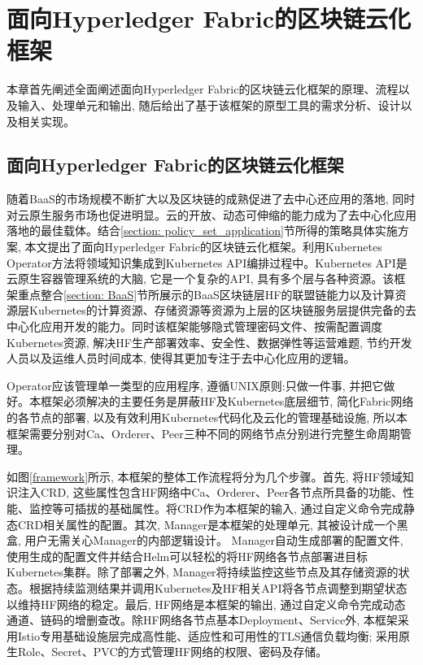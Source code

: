 \chapter{面向Hyperledger Fabric的区块链云化框架}

本章首先阐述全面阐述面向Hyperledger Fabric的区块链云化框架的原理、流程以及输入、处理单元和输出, 随后给出了基于该框架的原型工具的需求分析、设计以及相关实现。

\section{面向Hyperledger Fabric的区块链云化框架}\label{section: framework}

随着BaaS的市场规模不断扩大以及区块链的成熟促进了去中心还应用的落地, 同时对云原生服务市场也促进明显。云的开放、动态可伸缩的能力成为了去中心化应用落地的最佳载体。结合\ref{section: policy_set_application}节所得的策略具体实施方案, 本文提出了面向Hyperledger Fabric的区块链云化框架。利用Kubernetes Operator方法将领域知识集成到Kubernetes API编排过程中\cite{henning2021reproducible}。Kubernetes API是云原生容器管理系统的大脑, 它是一个复杂的API, 具有多个层与各种资源\cite{Yilmaz2021}。该框架重点整合\ref{section: BaaS}节所展示的BaaS区块链层HF的联盟链能力以及计算资源层Kubernetes的计算资源、存储资源等资源为上层的区块链服务层提供完备的去中心化应用开发的能力。同时该框架能够隐式管理密码文件、按需配置调度Kubernetes资源, 解决HF生产部署效率、安全性、数据弹性等运营难题, 节约开发人员以及运维人员时间成本, 使得其更加专注于去中心化应用的逻辑。

Operator应该管理单一类型的应用程序, 遵循UNIX原则:只做一件事, 并把它做好\cite{d2020design}。本框架必须解决的主要任务是屏蔽HF及Kubernetes底层细节, 简化Fabric网络的各节点的部署, 以及有效利用Kubernetes代码化及云化的管理基础设施, 所以本框架需要分别对Ca、Orderer、Peer三种不同的网络节点分别进行完整生命周期管理。

如图\ref{framework}所示, 本框架的整体工作流程将分为几个步骤。首先, 将HF领域知识注入CRD, 这些属性包含HF网络中Ca、Orderer、Peer各节点所具备的功能、性能、监控等可插拔的基础属性。将CRD作为本框架的输入, 通过自定义命令完成静态CRD相关属性的配置。其次, Manager是本框架的处理单元, 其被设计成一个黑盒\cite{yu2020system}, 用户无需关心Manager的内部逻辑设计。 Manager自动生成部署的配置文件, 使用生成的配置文件并结合Helm可以轻松的将HF网络各节点部署进目标Kubernetes集群。除了部署之外, Manager将持续监控这些节点及其存储资源的状态。根据持续监测结果并调用Kubernetes及HF相关API将各节点调整到期望状态以维持HF网络的稳定。最后, HF网络是本框架的输出, 通过自定义命令完成动态通道、链码的增删查改。除HF网络各节点基本Deployment、Service外, 本框架采用Istio专用基础设施层完成高性能、适应性和可用性\cite{li2019service}\cite{larsson2020impact}的TLS通信负载均衡; 采用原生Role、Secret、PVC的方式管理HF网络的权限、密码及存储。

